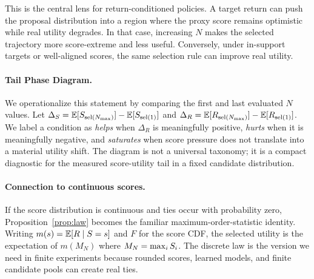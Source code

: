 This is the central lens for return-conditioned policies. A target return can push the proposal distribution into a region where the proxy score remains optimistic while real utility degrades. In that case, increasing $N$ makes the selected trajectory more score-extreme and less useful. Conversely, under in-support targets or well-aligned scores, the same selection rule can improve real utility.

\paragraph{Tail Phase Diagram.}
We operationalize this statement by comparing the first and last evaluated $N$ values. Let $\Delta_S=\mathbb{E}[S_{\operatorname{sel}(N_{\max})}]-\mathbb{E}[S_{\operatorname{sel}(1)}]$ and $\Delta_R=\mathbb{E}[R_{\operatorname{sel}(N_{\max})}]-\mathbb{E}[R_{\operatorname{sel}(1)}]$. We label a condition as \emph{helps} when $\Delta_R$ is meaningfully positive, \emph{hurts} when it is meaningfully negative, and \emph{saturates} when score pressure does not translate into a material utility shift. The diagram is not a universal taxonomy; it is a compact diagnostic for the measured score-utility tail in a fixed candidate distribution.

\paragraph{Connection to continuous scores.}
If the score distribution is continuous and ties occur with probability zero, Proposition~\ref{prop:law} becomes the familiar maximum-order-statistic identity. Writing $m(s)=\mathbb{E}[R\mid S=s]$ and $F$ for the score CDF, the selected utility is the expectation of $m(M_N)$ where $M_N=\max_i S_i$. The discrete law is the version we need in finite experiments because rounded scores, learned models, and finite candidate pools can create real ties.
